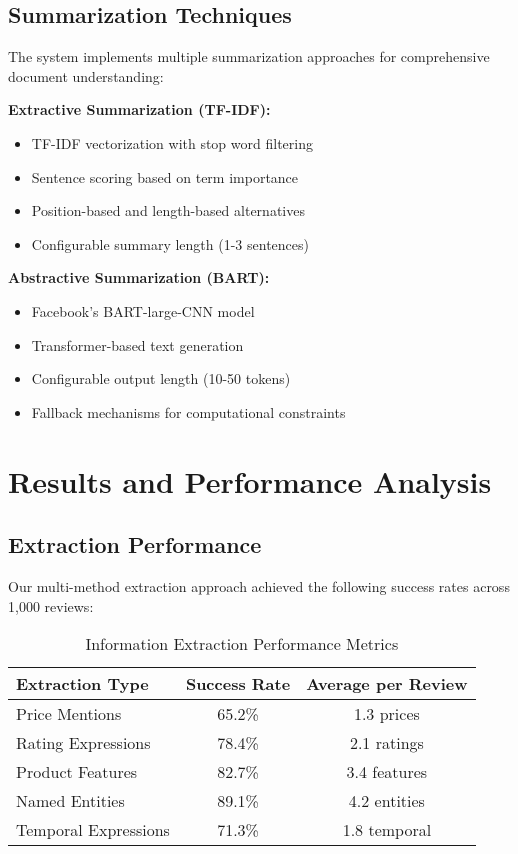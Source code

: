 \documentclass[11pt,a4paper]{article}
\begin{document}
\subsection{Summarization Techniques}

The system implements multiple summarization approaches for comprehensive document understanding:

\textbf{Extractive Summarization (TF-IDF):}
\begin{itemize}[noitemsep]
    \item TF-IDF vectorization with stop word filtering
    \item Sentence scoring based on term importance
    \item Position-based and length-based alternatives
    \item Configurable summary length (1-3 sentences)
\end{itemize}

\textbf{Abstractive Summarization (BART):}
\begin{itemize}[noitemsep]
    \item Facebook's BART-large-CNN model
    \item Transformer-based text generation
    \item Configurable output length (10-50 tokens)
    \item Fallback mechanisms for computational constraints
\end{itemize}

\section{Results and Performance Analysis}

\subsection{Extraction Performance}

Our multi-method extraction approach achieved the following success rates across 1,000 reviews:

\begin{table}[H]
\centering
\begin{tabular}{@{}lcc@{}}
\toprule
\textbf{Extraction Type} & \textbf{Success Rate} & \textbf{Average per Review} \\
\midrule
Price Mentions & 65.2\% & 1.3 prices \\
Rating Expressions & 78.4\% & 2.1 ratings \\
Product Features & 82.7\% & 3.4 features \\
Named Entities & 89.1\% & 4.2 entities \\
Temporal Expressions & 71.3\% & 1.8 temporal \\
\bottomrule
\end{tabular}
\caption{Information Extraction Performance Metrics}
\end{table}
\end{document}
